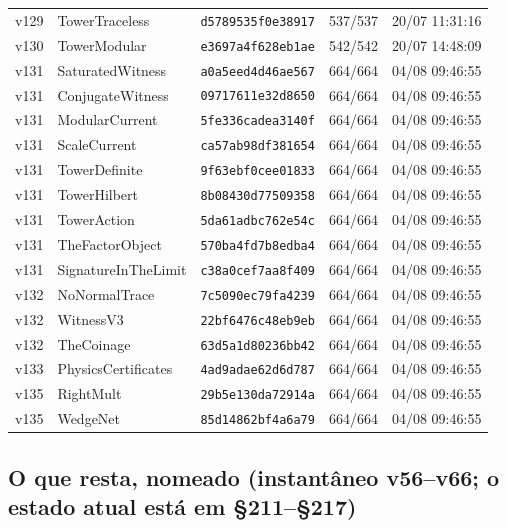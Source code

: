 \documentclass[11pt]{article}
\theoremstyle{definition}\newtheorem{deriv}{Derivação}
\begin{document}
{\begin{longtable}{@{}lllll@{}}
v129 & TowerTraceless & \texttt{d5789535f0e38917} & 537/537 & 20/07 11:31:16 \\
v130 & TowerModular & \texttt{e3697a4f628eb1ae} & 542/542 & 20/07 14:48:09 \\
v131 & SaturatedWitness & \texttt{a0a5eed4d46ae567} & 664/664 & 04/08 09:46:55 \\
v131 & ConjugateWitness & \texttt{09717611e32d8650} & 664/664 & 04/08 09:46:55 \\
v131 & ModularCurrent & \texttt{5fe336cadea3140f} & 664/664 & 04/08 09:46:55 \\
v131 & ScaleCurrent & \texttt{ca57ab98df381654} & 664/664 & 04/08 09:46:55 \\
v131 & TowerDefinite & \texttt{9f63ebf0cee01833} & 664/664 & 04/08 09:46:55 \\
v131 & TowerHilbert & \texttt{8b08430d77509358} & 664/664 & 04/08 09:46:55 \\
v131 & TowerAction & \texttt{5da61adbc762e54c} & 664/664 & 04/08 09:46:55 \\
v131 & TheFactorObject & \texttt{570ba4fd7b8edba4} & 664/664 & 04/08 09:46:55 \\
v131 & SignatureInTheLimit & \texttt{c38a0cef7aa8f409} & 664/664 & 04/08 09:46:55 \\
v132 & NoNormalTrace & \texttt{7c5090ec79fa4239} & 664/664 & 04/08 09:46:55 \\
v132 & WitnessV3 & \texttt{22bf6476c48eb9eb} & 664/664 & 04/08 09:46:55 \\
v132 & TheCoinage & \texttt{63d5a1d80236bb42} & 664/664 & 04/08 09:46:55 \\
v133 & PhysicsCertificates & \texttt{4ad9adae62d6d787} & 664/664 & 04/08 09:46:55 \\
v135 & RightMult & \texttt{29b5e130da72914a} & 664/664 & 04/08 09:46:55 \\
v135 & WedgeNet & \texttt{85d14862bf4a6a79} & 664/664 & 04/08 09:46:55 \\
\bottomrule\end{longtable}}

\subsection*{O que resta, nomeado (instantâneo v56--v66; o estado atual está em \S211--\S217)}
\end{document}

